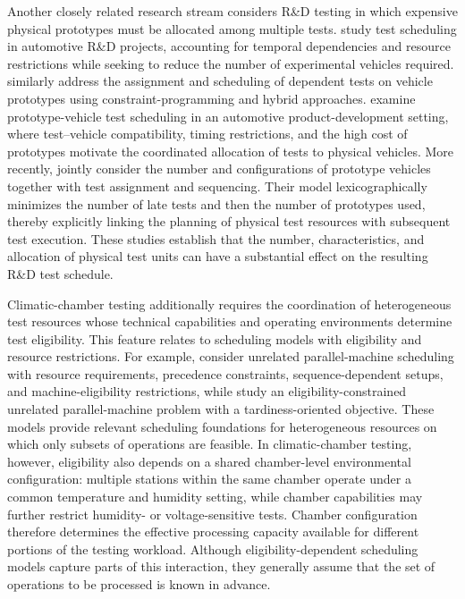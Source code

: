 Another closely related research stream considers {R\&D} testing in which
expensive physical prototypes must be allocated among multiple tests.
\citet{BartelsZimmermann2009} study test scheduling in automotive {R\&D}
projects, accounting for temporal dependencies and resource restrictions
while seeking to reduce the number of experimental vehicles required.
\citet{LimtanyakulSchwiegelshohn2012} similarly address the assignment and
scheduling of dependent tests on vehicle prototypes using
constraint-programming and hybrid approaches.
\citet{ShiReichEpelmanKlampflCohn2017} examine prototype-vehicle test
scheduling in an automotive product-development setting, where
test--vehicle compatibility, timing restrictions, and the high cost of
prototypes motivate the coordinated allocation of tests to physical vehicles.
More recently, \citet{ClautiauxEssodaiguiNguyenSadykovYounes2025} jointly
consider the number and configurations of prototype vehicles together with
test assignment and sequencing.
Their model lexicographically minimizes the number of late tests and then
the number of prototypes used, thereby explicitly linking the planning of
physical test resources with subsequent test execution.
These studies establish that the number, characteristics, and allocation of
physical test units can have a substantial effect on the resulting {R\&D}
test schedule.

Climatic-chamber testing additionally requires the coordination of
heterogeneous test resources whose technical capabilities and operating
environments determine test eligibility.
This feature relates to scheduling models with eligibility and resource
restrictions.
For example, \citet{AfzaliradRezaeian2016} consider unrelated
parallel-machine scheduling with resource requirements, precedence
constraints, sequence-dependent setups, and machine-eligibility
restrictions, while \citet{MaeckerShenMonch2023} study an
eligibility-constrained unrelated parallel-machine problem with a
tardiness-oriented objective.
These models provide relevant scheduling foundations for heterogeneous
resources on which only subsets of operations are feasible.
In climatic-chamber testing, however, eligibility also depends on a shared
chamber-level environmental configuration: multiple stations within the same
chamber operate under a common temperature and humidity setting, while
chamber capabilities may further restrict humidity- or voltage-sensitive
tests.
Chamber configuration therefore determines the effective processing capacity
available for different portions of the testing workload.
Although eligibility-dependent scheduling models capture parts of this
interaction, they generally assume that the set of operations to be
processed is known in advance.

